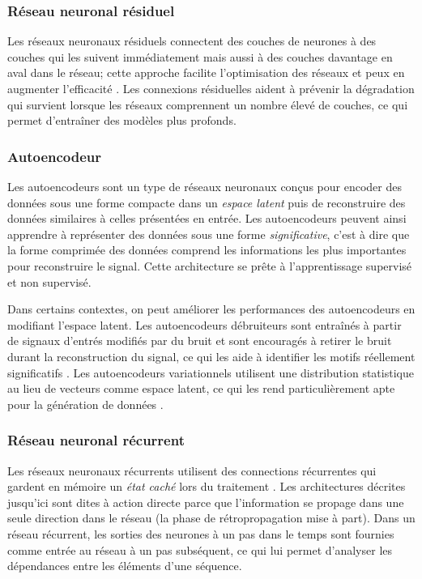 \subsubsection{Réseau neuronal résiduel}
Les réseaux neuronaux résiduels connectent des couches de neurones à des couches qui les suivent
immédiatement mais aussi à des couches davantage en aval dans le réseau; cette approche facilite
l'optimisation des réseaux et peux en augmenter l'efficacité \cite{he2016}. Les connexions
résiduelles aident à prévenir la dégradation qui survient lorsque les réseaux comprennent un nombre
élevé de couches, ce qui permet d'entraîner des modèles plus profonds.

\subsubsection{Autoencodeur}
Les autoencodeurs \cite{bank2023} sont un type de réseaux neuronaux conçus pour encoder des données
sous une forme compacte dans un \textit{espace latent} puis de reconstruire des données similaires à
celles présentées en entrée. Les autoencodeurs peuvent ainsi apprendre à représenter des données
sous une forme \textit{significative}, c'est à dire que la forme comprimée des données comprend les
informations les plus importantes pour reconstruire le signal. Cette architecture se prête à
l'apprentissage supervisé et non supervisé.

Dans certains contextes, on peut améliorer les performances des autoencodeurs en modifiant l'espace
latent. Les autoencodeurs débruiteurs sont entraînés à partir de signaux d'entrés modifiés par du
bruit et sont encouragés à retirer le bruit durant la reconstruction du signal, ce qui les aide à
identifier les motifs réellement significatifs \cite{gondara2016}. Les autoencodeurs variationnels
utilisent une distribution statistique au lieu de vecteurs comme espace latent, ce qui les rend
particulièrement apte pour la génération de données \cite{PinheiroCinelli2021}.

\subsubsection{Réseau neuronal récurrent}
Les réseaux neuronaux récurrents utilisent des connections récurrentes qui gardent en mémoire un
\textit{état caché} lors du traitement \cite{sak2014}. Les architectures décrites jusqu'ici sont
dites à action directe parce que l'information se propage dans une seule direction dans le réseau
(la phase de rétropropagation mise à part). Dans un réseau récurrent, les sorties des neurones à un
pas dans le temps sont fournies comme entrée au réseau à un pas subséquent, ce qui lui permet
d'analyser les dépendances entre les éléments d'une séquence.

